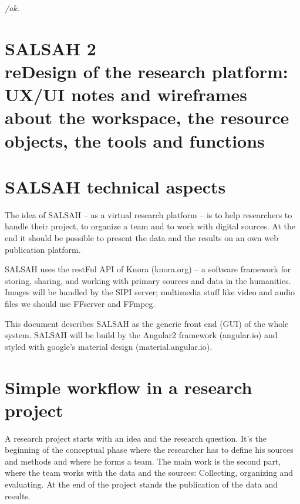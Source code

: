 \documentclass[12pt]{article} %
\begin{document}
\thispagestyle{empty}

\textit{\todayDDMMYYYY{}/ak.}
\vspace{4cm}
\section*{SALSAH 2\\reDesign of the research platform:\\UX/UI notes and wireframes about the workspace, the resource objects, the tools and functions}

\newpage

\tableofcontents

\newpage


\section{SALSAH technical aspects}

The idea of SALSAH -- as a virtual research platform -- is to help researchers to handle their project, to organize a team and to work with digital sources. At the end it should be possible to present the data and the results on an own web publication platform.

SALSAH uses the restFul API of Knora (knora.org) --  a software framework for storing, sharing, and working with primary sources and data in the humanities. Images will be handled by the SIPI server; multimedia stuff like video and audio files we should use FFserver and FFmpeg.

This document describes SALSAH as the generic front end (GUI) of the whole system. SALSAH will be build by the Angular2 framework (angular.io) and styled with google's material design (material.angular.io).

\section{Simple workflow in a research project}

A research project starts with an idea and the research question. It's the beginning of the conceptual phase where the researcher has to define his sources and methods and where he forms a team. The main work is the second part, where the team works with the data and the sources: Collecting, organizing and evaluating. At the end of the project stands the publication of the data and results.
\end{document}
